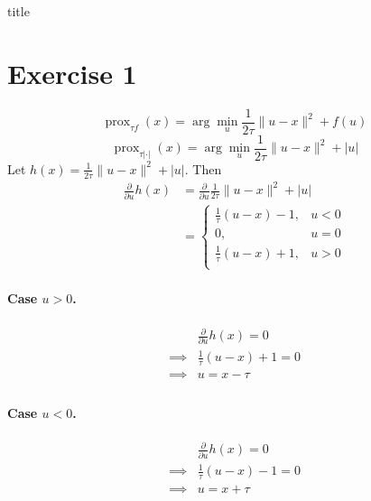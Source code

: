 \documentclass[12pt]{article}
\newcommand{\prox}{\operatorname{prox}}
\begin{document}
{title}

\tableofcontents




\section{Exercise 1}
\begin{equation}
  \prox_{\tau f}(x) = \arg\min_{u} \frac{1}{2\tau}\|u-x\|^2 + f(u)
\end{equation}
\begin{equation}
  \prox_{\tau |\cdot|}(x) = \arg\min_{u} \frac{1}{2\tau}\|u-x\|^2 + |u|
\end{equation}
\begin{equation}
\end{equation}
Let $h(x) = \frac{1}{2\tau}\|u-x\|^2 + |u|$. Then
\begin{align*}
  \frac{\partial}{\partial u} h(x)
   & = \frac{\partial}{\partial u} \frac{1}{2\tau}\|u-x\|^2 + |u| \\
   & =
  \begin{cases}
    \frac{1}{\tau}(u-x) - 1,  & u < 0 \\
    0,                        & u = 0 \\
    \frac{1}{\tau} (u-x) + 1, & u > 0 \\
  \end{cases}
\end{align*}

\paragraph{Case $u > 0$.}
\begin{align*}
           &
  \frac{\partial}{\partial u} h(x) = 0 \\
  \implies &
  \frac{1}{\tau} (u-x) + 1 = 0 \\
  \implies &
  u = x - \tau                 \\
\end{align*}

\paragraph{Case $u < 0$.}
\begin{align*}
           &
  \frac{\partial}{\partial u} h(x) = 0 \\
  \implies &
  \frac{1}{\tau} (u-x) - 1 = 0 \\
  \implies &
  u = x + \tau                 \\
\end{align*}
\end{document}
